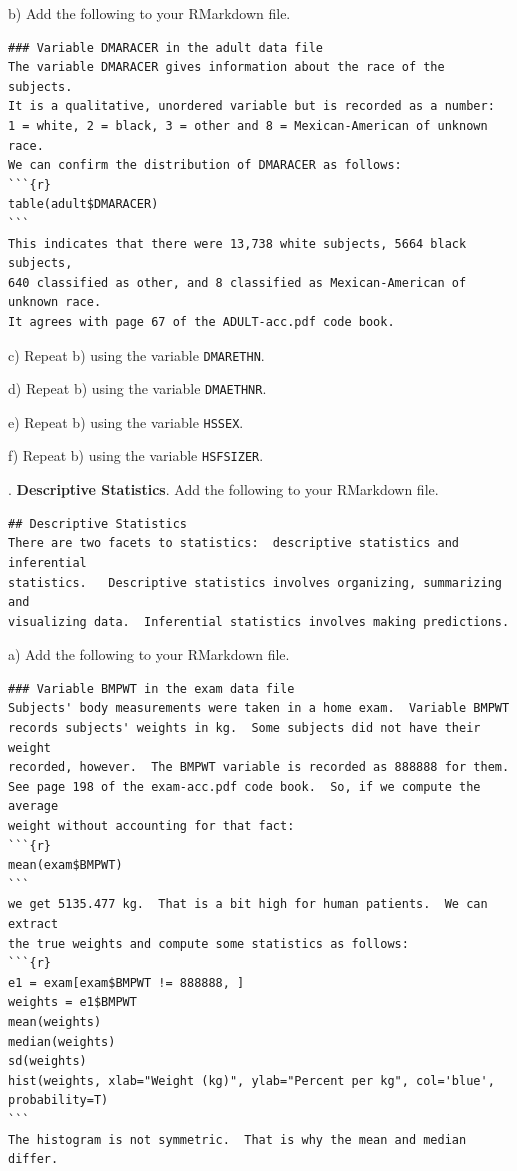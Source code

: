 \documentclass[10pt]{article}
\newcounter{EX}\setcounter{EX}{1}
\newcommand{\EXERCISE}{\arabic{EX}.\stepcounter{EX} }
\begin{document}
\hspace{10pt} b)  Add the following to your RMarkdown file.\vspace{-6pt}

\begin{verbatim}
### Variable DMARACER in the adult data file
The variable DMARACER gives information about the race of the subjects.
It is a qualitative, unordered variable but is recorded as a number:
1 = white, 2 = black, 3 = other and 8 = Mexican-American of unknown race.
We can confirm the distribution of DMARACER as follows:
```{r}
table(adult$DMARACER)
```
This indicates that there were 13,738 white subjects, 5664 black subjects,
640 classified as other, and 8 classified as Mexican-American of unknown race.
It agrees with page 67 of the ADULT-acc.pdf code book.
\end{verbatim}

\hspace{10pt} c) Repeat b) using the variable \texttt{DMARETHN}.

\hspace{10pt} d) Repeat b) using the variable \texttt{DMAETHNR}.

\hspace{10pt} e) Repeat b) using the variable \texttt{HSSEX}.

\hspace{10pt} f) Repeat b) using the variable \texttt{HSFSIZER}.
\vfill
\eject

\EXERCISE \textbf{Descriptive Statistics}. Add the following to your
RMarkdown file.\vspace{-6pt}

\begin{verbatim}
## Descriptive Statistics
There are two facets to statistics:  descriptive statistics and inferential
statistics.   Descriptive statistics involves organizing, summarizing and
visualizing data.  Inferential statistics involves making predictions.
\end{verbatim}

\hspace{10pt} a) Add the following to your RMarkdown file.\vspace{-6pt}

\begin{verbatim}
### Variable BMPWT in the exam data file
Subjects' body measurements were taken in a home exam.  Variable BMPWT
records subjects' weights in kg.  Some subjects did not have their weight
recorded, however.  The BMPWT variable is recorded as 888888 for them.
See page 198 of the exam-acc.pdf code book.  So, if we compute the average 
weight without accounting for that fact:
```{r}
mean(exam$BMPWT)
```
we get 5135.477 kg.  That is a bit high for human patients.  We can extract
the true weights and compute some statistics as follows:
```{r}
e1 = exam[exam$BMPWT != 888888, ]
weights = e1$BMPWT
mean(weights)
median(weights)
sd(weights)
hist(weights, xlab="Weight (kg)", ylab="Percent per kg", col='blue', probability=T)
```
The histogram is not symmetric.  That is why the mean and median differ.
\end{verbatim}
\end{document}
